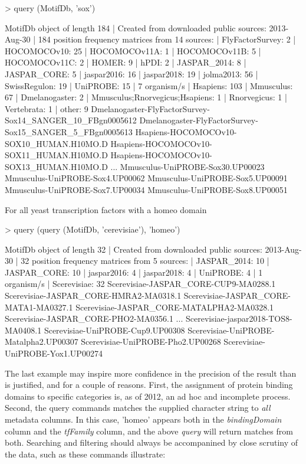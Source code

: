 \documentclass{article}
\renewenvironment{Schunk}{\vspace{\topsep}}{\vspace{\topsep}}
\begin{document}
\begin{Schunk}
\begin{Sinput}
> query (MotifDb, 'sox')
\end{Sinput}
\begin{Soutput}
MotifDb object of length 184
| Created from downloaded public sources: 2013-Aug-30
| 184 position frequency matrices from 14 sources:
|    FlyFactorSurvey:    2
|        HOCOMOCOv10:   25
|       HOCOMOCOv11A:    1
|       HOCOMOCOv11B:    5
|       HOCOMOCOv11C:    2
|              HOMER:    9
|               hPDI:    2
|        JASPAR_2014:    8
|        JASPAR_CORE:    5
|         jaspar2016:   16
|         jaspar2018:   19
|          jolma2013:   56
|       SwissRegulon:   19
|           UniPROBE:   15
| 7 organism/s
|           Hsapiens:  103
|          Mmusculus:   67
|      Dmelanogaster:    2
| Mmusculus;Rnorvegicus;Hsapiens:    1
|        Rnorvegicus:    1
|         Vertebrata:    1
|              other:    9
Dmelanogaster-FlyFactorSurvey-Sox14_SANGER_10_FBgn0005612 
Dmelanogaster-FlyFactorSurvey-Sox15_SANGER_5_FBgn0005613 
Hsapiens-HOCOMOCOv10-SOX10_HUMAN.H10MO.D 
Hsapiens-HOCOMOCOv10-SOX11_HUMAN.H10MO.D 
Hsapiens-HOCOMOCOv10-SOX13_HUMAN.H10MO.D 
...
Mmusculus-UniPROBE-Sox30.UP00023 
Mmusculus-UniPROBE-Sox4.UP00062 
Mmusculus-UniPROBE-Sox5.UP00091 
Mmusculus-UniPROBE-Sox7.UP00034 
Mmusculus-UniPROBE-Sox8.UP00051 
\end{Soutput}
\end{Schunk}
For all yeast transcription factors with a homeo domain
\begin{Schunk}
\begin{Sinput}
> query (query (MotifDb, 'cerevisiae'), 'homeo')
\end{Sinput}
\begin{Soutput}
MotifDb object of length 32
| Created from downloaded public sources: 2013-Aug-30
| 32 position frequency matrices from 5 sources:
|        JASPAR_2014:   10
|        JASPAR_CORE:   10
|         jaspar2016:    4
|         jaspar2018:    4
|           UniPROBE:    4
| 1 organism/s
|        Scerevisiae:   32
Scerevisiae-JASPAR_CORE-CUP9-MA0288.1 
Scerevisiae-JASPAR_CORE-HMRA2-MA0318.1 
Scerevisiae-JASPAR_CORE-MATA1-MA0327.1 
Scerevisiae-JASPAR_CORE-MATALPHA2-MA0328.1 
Scerevisiae-JASPAR_CORE-PHO2-MA0356.1 
...
Scerevisiae-jaspar2018-TOS8-MA0408.1 
Scerevisiae-UniPROBE-Cup9.UP00308 
Scerevisiae-UniPROBE-Matalpha2.UP00307 
Scerevisiae-UniPROBE-Pho2.UP00268 
Scerevisiae-UniPROBE-Yox1.UP00274 
\end{Soutput}
\end{Schunk}
The last example may inspire more confidence in the precision of the result than is justified, and for a couple
of reasons.  First, the assignment of  protein binding domains to specific categories is, as of 2012, an ad hoc
and incomplete process.  Second, the query commands matches the supplied character string to \emph{all} metadata
columns.  In this case, 'homeo' appears both in the \emph{bindingDomain} column and the \emph{tfFamily} column,
and the above \emph{query} will return matches from both.
Searching and filtering should always be accompanined by close scrutiny of the data, such as these commands
illustrate:
\end{document}

